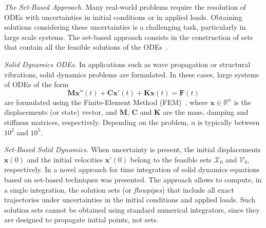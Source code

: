 \documentclass{juliacon}
\begin{document}
	


\maketitle

\emph{The Set-Based Approach.} %
%
Many real-world problems require the resolution of ODEs with uncertainties in initial conditions or in applied loads. Obtaining solutions considering these uncertainties is a challenging task, particularly in large scale systems. The set-based approach consists in the construction of sets that contain all the feasible solutions of the ODEs~\cite{althoff2020set}. %


\vspace{0.2cm}

\emph{Solid Dynamics ODEs.} %
%
In applications such as wave propagation or structural vibrations, solid dynamics problems are formulated. In these cases, large systems of ODEs of the form
%
\begin{equation}\label{eq:second_order}
\mathbf{M} \mathbf{x}''(t) + \mathbf{C}\mathbf{x}'(t) + \mathbf{K}\mathbf{x}(t) = \mathbf{F}(t)
\end{equation}
%
are formulated using the Finite-Element Method (FEM)~\cite{Bathe2014}, where $\mathbf{x} \in \mathbb{R}^n$ is the displacements (or state) vector, and $\mathbf{M}$, $\mathbf{C}$ and $\mathbf{K}$ are the mass, damping and stiffness matrices, respectively. Depending on the problem, $n$ is typically  between $10^2$ and $10^5$.

	
\vspace{0.2cm}

\emph{Set-Based Solid Dynamics.} %
%
When uncertainty is present, the initial displacements $\mathbf{x}(0)$ and the initial velocities $\mathbf{x}'(0)$ belong to the feasible sets $\mathcal{X}_0$ and  $\mathcal{V}_0$, respectively. %
%
In \cite{forets2021combining} a novel approach for time integration of solid dynamics equations based on set-based techniques was presented. %
%
The approach allows to compute, in a single integration, the solution sets (or \emph{flowpipes}) that include all exact trajectories under uncertainties in the initial conditions and applied loads.
%
Such solution sets cannot be obtained using standard numerical integrators, since they are designed to propagate initial points, not sets.

\vspace{0.2cm}
\end{document}

